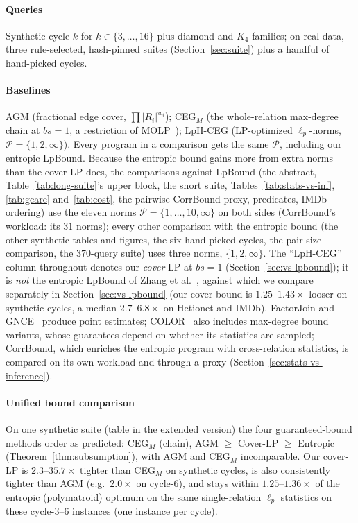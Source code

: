 \documentclass[sigconf, nonacm, acmthm=false]{acmart}
\begin{document}
\paragraph{Queries}
Synthetic cycle-$k$ for $k \in \{3,\ldots,16\}$ plus diamond and $K_4$ families;
on real data, three rule-selected, hash-pinned suites
(Section~\ref{sec:suite}) plus a handful of hand-picked cycles.

\paragraph{Baselines}
AGM (fractional edge cover, $\prod |R_i|^{w_i}$);
CEG$_M$ (the whole-relation max-degree chain at $bs{=}1$, a restriction of MOLP~\cite{joglekar2016molp,chen2022ceg});
LpH-CEG (LP-optimized $\ell_p$-norms,
$\mathcal{P} = \{1,2,\infty\}$). Every program in a comparison gets the
same $\mathcal{P}$, including our entropic LpBound. Because the entropic
bound gains more from extra norms than the cover LP does, the comparisons
against LpBound (the abstract, Table~\ref{tab:long-suite}'s
upper block, the short suite, Tables~\ref{tab:stats-vs-inf}, \ref{tab:gcare} and~\ref{tab:cost}, the pairwise CorrBound proxy, predicates, IMDb ordering) use
the eleven norms $\mathcal{P}=\{1,\ldots,10,\infty\}$ on both sides (CorrBound's workload: its $31$ norms); every other comparison
with the entropic bound (the other synthetic tables and figures, the six
hand-picked cycles, the pair-size comparison, the $370$-query suite) uses three
norms, $\{1,2,\infty\}$.
The ``LpH-CEG'' column throughout denotes our
\emph{cover}-LP at $bs{=}1$ (Section~\ref{sec:vs-lpbound}); it is
\emph{not} the entropic LpBound of
Zhang et al.~\cite{zhang2025lpbound}, against which we compare
separately in Section~\ref{sec:vs-lpbound} (our cover bound is
$1.25$--$1.43\times$ looser on synthetic cycles, a median
$2.7$--$6.8\times$ on Hetionet and IMDb).
FactorJoin and GNCE~\cite{wu2023factorjoin,schwabe2024gnce} produce point estimates; COLOR~\cite{deeds2025color} also includes max-degree bound variants, whose guarantees depend on whether its statistics are sampled; CorrBound, which enriches the
entropic program with cross-relation statistics, is compared on its own workload and through a proxy (Section~\ref{sec:stats-vs-inference}).

\paragraph{Unified bound comparison}
On one synthetic suite (table in the extended version) the four guaranteed-bound methods order as predicted: CEG$_M$ (chain), AGM $\ge$ Cover-LP $\ge$ Entropic
(Theorem~\ref{thm:subsumption}), with AGM and CEG$_M$ incomparable. Our cover-LP is
$2.3$--$35.7\times$ tighter than CEG$_M$ on synthetic cycles, is also
consistently tighter than AGM (e.g.\ $2.0\times$ on cycle-6), and stays
within $1.25$--$1.36\times$ of the entropic (polymatroid) optimum on the
same single-relation $\ell_p$ statistics on these cycle-$3$--$6$ instances (one instance per cycle).
\end{document}
